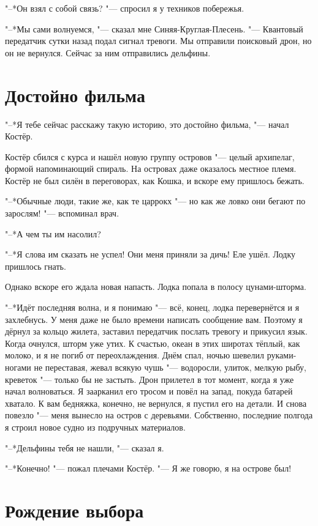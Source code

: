 \documentclass[a4paper,10pt]{book}
\begin{document}
"--*Он взял с собой связь? "--- спросил я у техников побережья.

"--*Мы сами волнуемся, "--- сказал мне Синяя-Круглая-Плесень. "--- Квантовый передатчик сутки назад подал сигнал тревоги. Мы отправили поисковый дрон, но он не вернулся. Сейчас за ним отправились дельфины.

\section{Достойно фильма}

"--*Я тебе сейчас расскажу такую историю, это достойно фильма, "--- начал Костёр.

Костёр сбился с курса и нашёл новую группу островов "--- целый архипелаг, формой напоминающий спираль. На островах даже оказалось местное племя. Костёр не был силён в переговорах, как Кошка, и вскоре ему пришлось бежать.

"--*Обычные люди, такие же, как те царрокх "--- но как же ловко они бегают по зарослям! "--- вспоминал врач.

"--*А чем ты им насолил?

"--*Я слова им сказать не успел! Они меня приняли за дичь! Еле ушёл. Лодку пришлось гнать.

Однако вскоре его ждала новая напасть. Лодка попала в полосу цунами-шторма.

"--*Идёт последняя волна, и я понимаю "--- всё, конец, лодка перевернётся и я захлебнусь. У меня даже не было времени написать сообщение вам. Поэтому я дёрнул за кольцо жилета, заставил передатчик послать тревогу и прикусил язык. Когда очнулся, шторм уже утих. К счастью, океан в этих широтах тёплый, как молоко, и я не погиб от переохлаждения. Днём спал, ночью шевелил руками-ногами не переставая, жевал всякую чушь "--- водоросли, улиток, мелкую рыбу, креветок "--- только бы не застыть. Дрон прилетел в тот момент, когда я уже начал волноваться. Я заарканил его тросом и повёл на запад, покуда батарей хватало. К вам бедняжка, конечно, не вернулся, я пустил его на детали. И снова повезло "--- меня вынесло на остров с деревьями. Собственно, последние полгода я строил новое судно из подручных материалов.

"--*Дельфины тебя не нашли, "--- сказал я.

"--*Конечно! "--- пожал плечами Костёр. "--- Я же говорю, я на острове был!
 
 \section{Рождение выбора}
\end{document}
